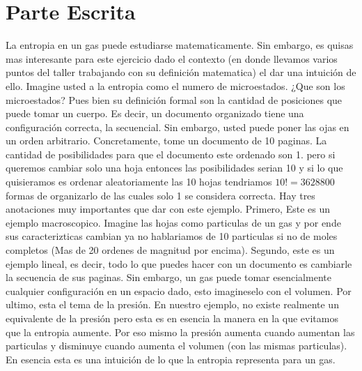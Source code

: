 \documentclass[12pt]{exam}
\begin{document}
\section*{Parte Escrita}
La entropia en un gas puede estudiarse matematicamente. Sin embargo, es quisas mas interesante para este ejercicio dado el contexto (en donde llevamos varios puntos del taller trabajando con su definición matematica) el dar una intuición de ello. Imagine usted a la entropia como el numero de microestados. ¿Que son los microestados? Pues bien su definición formal son la cantidad de posiciones que puede tomar un cuerpo. Es decir, un documento organizado tiene una configuración correcta, la secuencial. Sin embargo, usted puede poner las ojas en un orden arbitrario. Concretamente, tome un documento de 10 paginas. La cantidad de posibilidades para que el documento este ordenado son 1. pero si queremos cambiar solo una hoja entonces las posibilidades serian 10 y si lo que quisieramos es ordenar aleatoriamente las 10 hojas tendriamos $10! = 3628800$ formas de organizarlo de las cuales solo 1 se considera correcta. Hay tres anotaciones muy importantes que dar con este ejemplo. Primero, Este es un ejemplo macroscopico. Imagine las hojas como particulas de un gas y por ende sus caracterizticas cambian ya no hablariamos de 10 particulas si no de moles completos (Mas de 20 ordenes de magnitud por encima). Segundo, este es un ejemplo lineal, es decir, todo lo que puedes hacer con un documento es cambiarle la  secuencia de sus paginas. Sin embargo, un gas puede tomar esencialmente cualquier configuración en un espacio dado, esto imagineselo con el volumen. Por ultimo, esta el tema de la presión. En nuestro ejemplo,  no existe realmente un equivalente de la presión pero esta es en esencia la manera en la que evitamos que la entropia aumente. Por eso mismo la presión aumenta cuando aumentan las particulas y disminuye cuando aumenta el volumen (con las mismas particulas). En esencia esta es una intuición de lo que la entropia representa para un gas.
\end{document}
